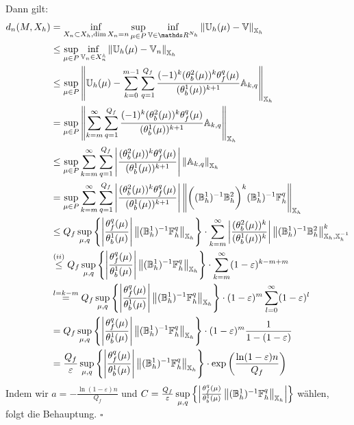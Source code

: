 Dann gilt:
\begin{align*}
d_n(M,X_h) &= \inf\limits_{X_n\subset X_h, \dim X_n=n} \sup\limits_{\mu\in P} \inf\limits_{\mathbb{V}\in \R^{N_h}} \norm{\mathbb{U}_h(\mu)- \mathbb{V}}_{\mathbb{X}_h}\\
&\le \sup\limits_{\mu\in P} \inf\limits_{\mathbb{V}_n\in X_n^{\mathbb{A}}}  \norm{\mathbb{U}_h(\mu)- \mathbb{V}_n}_{\mathbb{X}_h}\\
&\le \sup\limits_{\mu\in P} \norm{\mathbb{U}_h(\mu)- \sum_{k=0}^{m-1} \sum_{q=1}^{Q_f} \frac{(-1)^k (\theta_b^2(\mu))^k \theta_f^q(\mu)}{(\theta_b^1(\mu))^{k+1}} \mathbb{A}_{k,q} }_{\mathbb{X}_h}\\
&= \sup\limits_{\mu\in P} \norm{\sum_{k=m}^{\infty} \sum_{q=1}^{Q_f} \frac{(-1)^k (\theta_b^2(\mu))^k \theta_f^q(\mu)}{(\theta_b^1(\mu))^{k+1}} \mathbb{A}_{k,q} }_{\mathbb{X}_h}\\
&\le \sup\limits_{\mu\in P} \sum_{k=m}^{\infty} \sum_{q=1}^{Q_f} \abs{ \frac{(\theta_b^2(\mu))^k \theta_f^q(\mu)}{(\theta_b^1(\mu))^{k+1}} } \norm{\mathbb{A}_{k,q}}_{\mathbb{X}_h}\\
&= \sup\limits_{\mu\in P} \sum_{k=m}^{\infty} \sum_{q=1}^{Q_f} \abs{ \frac{(\theta_b^2(\mu))^k \theta_f^q(\mu)}{(\theta_b^1(\mu))^{k+1}} } \norm{ \bigg((\mathbb{B}_h^1)^{-1}\mathbb{B}_h^2\bigg)^k (\mathbb{B}_h^1)^{-1} \mathbb{F}_h^q }_{\mathbb{X}_h}\\
&\le Q_f \sup\limits_{\mu,q} \penbrace{ \abs{ \frac{\theta_f^q(\mu)}{\theta_b^1(\mu)}} \norm{(\mathbb{B}_h^1)^{-1} \mathbb{F}_h^q}_{\mathbb{X}_h} }  \cdot \sum_{k=m}^{\infty} \abs{ \frac{(\theta_b^2(\mu))^k}{(\theta_b^1(\mu))^k} } \norm{(\mathbb{B}_h^1)^{-1}\mathbb{B}_h^2}^k_{\mathbb{X}_h,\mathbb{X}_h^{-1}}\\
&\stackrel{(ii)}{\le} Q_f \sup\limits_{\mu,q} \penbrace{ \abs{ \frac{\theta_f^q(\mu)}{\theta_b^1(\mu)}} \norm{(\mathbb{B}_h^1)^{-1} \mathbb{F}_h^q}_{\mathbb{X}_h} }  \cdot \sum_{k=m}^{\infty} (1-\varepsilon)^{k-m+m}\\
&\stackrel{l=k-m}{=} Q_f \sup\limits_{\mu,q} \penbrace{ \abs{ \frac{\theta_f^q(\mu)}{\theta_b^1(\mu)}} \norm{(\mathbb{B}_h^1)^{-1} \mathbb{F}_h^q}_{\mathbb{X}_h} }  \cdot (1-\varepsilon)^m \sum_{l=0}^{\infty} (1-\varepsilon)^l\\
&= Q_f \sup\limits_{\mu,q} \penbrace{ \abs{ \frac{\theta_f^q(\mu)}{\theta_b^1(\mu)}} \norm{(\mathbb{B}_h^1)^{-1} \mathbb{F}_h^q}_{\mathbb{X}_h} }  \cdot (1-\varepsilon)^m \frac{1}{1-(1-\varepsilon)}\\
&= \frac{Q_f}{\varepsilon} \sup\limits_{\mu,q} \penbrace{ \abs{ \frac{\theta_f^q(\mu)}{\theta_b^1(\mu)}} \norm{(\mathbb{B}_h^1)^{-1} \mathbb{F}_h^q}_{\mathbb{X}_h} }  \cdot \exp \enbrace{\frac{\ln (1-\varepsilon)n}{Q_f}}
\end{align*}
Indem wir $a = -\frac{\ln (1-\varepsilon)n}{Q_f}$ und $C = \frac{Q_f}{\varepsilon} \sup\limits_{\mu,q} \left\{ \left\vert \frac{\theta_f^q(\mu)}{\theta_b^1(\mu)} \left\Vert(\mathbb{B}_h^1)^{-1} \mathbb{F}_h^q\right\Vert_{\mathbb{X}_h} \right\vert \right\}$ wählen, folgt die Behauptung.
\hfill $\square$

